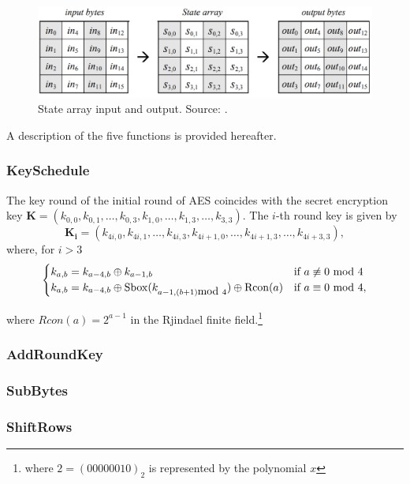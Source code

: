 \begin{figure}
\includegraphics[width = \textwidth]{../Figures/FISP_AES/state.png} 
\caption[State array input and output.]{State array input and output. Source: \cite{nist197}.}\label{fig:AES_state}
\end{figure}

A description of the five functions is provided hereafter.

\subsubsection*{KeySchedule}
The key round of the initial round of AES coincides with the secret encryption key $\boldsymbol{K} = (k_{0,0},k_{0,1},\dots,k_{0,3}, k_{1,0},\dots,k_{1,3},\dots,k_{3,3})$. The $i$-th round key is given by 
\begin{equation*}
\boldsymbol{K_i} = (k_{4i,0},k_{4i,1},\dots,k_{4i,3}, k_{4i+1,0},\dots,k_{4i+1,3},\dots,k_{4i+3,3}),
\end{equation*}
where, for $i>3$
\begin{equation*}
\begin{cases}
k_{a,b} = k_{a-4,b}\oplus k_{a-1,b} & \mbox{if } a \not\equiv 0 \mbox{ mod } 4\\
k_{a,b} = k_{a-4,b}\oplus \mathrm{Sbox}(k_{a-1,(b+1) \mbox{mod } 4}) \oplus \mathrm{Rcon}(a) & \mbox{if } a \equiv 0 \mbox{ mod } 4 \mathrm{,}
\end{cases}
\end{equation*}

where $Rcon(a) = 2^{a-1}$ in the Rjindael finite field.\footnote{where $2=(00000010)_2$ is represented by the polynomial $x$}

\subsubsection*{AddRoundKey}
\subsubsection*{SubBytes}
\subsubsection*{ShiftRows}
